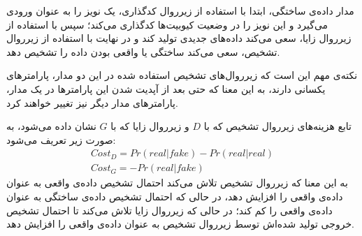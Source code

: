 مدار داده‌ی ساختگی، ابتدا با استفاده از زیرروال کدگذاری، یک نویز را به عنوان ورودی می‌گیرد و این نویز را  در وضعیت کیوبیت‌ها کدگذاری می‌کند؛ سپس با استفاده از زیرروال زایا، سعی می‌کند داده‌های جدیدی تولید کند و در نهایت با استفاده از زیرروال تشخیص، سعی می‌کند ساختگی یا واقعی بودن داده را تشخیص دهد.

نکته‌ی مهم این است که زیرروال‌های تشخیص استفاده شده در این دو مدار، پارامترهای یکسانی دارند، به این معنا که حتی بعد از آپدیت شدن این پارامترها در یک مدار، پارامترهای مدار دیگر نیز تغییر خواهند کرد.

تابع هزینه‌های زیرروال تشخیص که با 
$D$
و زیرروال زایا که با
$G$
نشان داده می‌شود، به صورت زیر تعریف می‌شود:
\begin{equation} \label{eqn:qugan_cost}
    \begin{gathered}
        Cost_D = Pr(real|fake) - Pr(real|real)  \\
        Cost_G = -Pr(real|fake)
    \end{gathered}
\end{equation}
به این معنا که زیرروال تشخیص تلاش می‌کند احتمال تشخیص داده‌ی واقعی به عنوان داده‌ی واقعی را افزایش دهد، در حالی که احتمال تشخیص داده‌ی ساختگی به عنوان داده‌ی واقعی را کم کند؛ در حالی که زیرروال زایا تلاش می‌کند تا احتمال تشخیص خروجی تولید شده‌اش توسط زیرروال تشخیص به عنوان داده‌ی واقعی را افزایش دهد.



